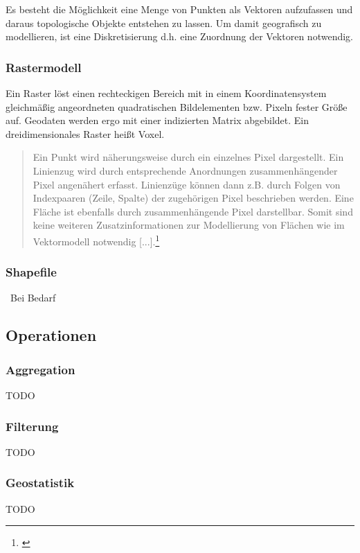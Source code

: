 Es besteht die Möglichkeit eine Menge von Punkten als Vektoren aufzufassen und daraus topologische Objekte entstehen zu lassen.
Um damit geografisch zu modellieren, ist eine Diskretisierung d.h. eine Zuordnung der Vektoren notwendig. 

\subsubsection{Rastermodell}

Ein Raster löst einen rechteckigen Bereich mit in einem Koordinatensystem gleichmäßig angeordneten quadratischen Bildelementen bzw. Pixeln fester Größe auf.
Geodaten werden ergo mit einer indizierten Matrix abgebildet.
Ein dreidimensionales Raster heißt Voxel.
\begin{quote}
Ein Punkt wird näherungsweise durch ein einzelnes Pixel dargestellt. Ein Linienzug wird durch entsprechende Anordnungen zusammenhängender Pixel angenähert erfasst. Linienzüge können dann z.B. durch Folgen von Indexpaaren (Zeile, Spalte) der zugehörigen Pixel beschrieben werden. Eine Fläche ist ebenfalls durch zusammenhängende Pixel darstellbar. Somit sind keine weiteren Zusatzinformationen zur Modellierung von Flächen wie im Vektormodell notwendig [...].\footnote{\cite[S.136]{book:gi-theopluspraxis3}}
\end{quote}


\subsubsection{Shapefile}\
Bei Bedarf

\subsection{Operationen}

\subsubsection{Aggregation}
TODO

\subsubsection{Filterung}
TODO

\subsubsection{Geostatistik}
TODO

